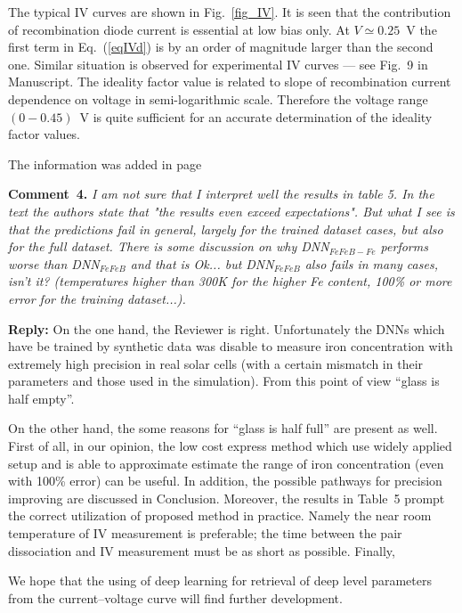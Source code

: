 \documentclass[num-refs]{wiley-article} %
\begin{document}
The typical IV curves are shown in Fig.~\ref{fig_IV}.
It is seen that the contribution of recombination diode current is essential at low bias only.
At $V\simeq 0.25$~V the first term in Eq.~(\ref{eqIVd}) is
by an order of magnitude larger than the second one.
Similar situation is observed for
experimental IV curves --- see Fig.~9 in Manuscript.
The ideality factor value is related to slope of recombination current
dependence on voltage in semi-logarithmic scale.
Therefore the voltage range $(0-0.45)$~V is quite sufficient for an accurate determination of the ideality factor values.



The information was added in page


\vspace{1cm}
\noindent
\textcolor[rgb]{0.00,0.50,1.00}{\textbf{Comment~4.}}
\emph{I am not sure that I interpret well the results in table 5.
In the text the authors state that "the results even exceed expectations".
But what I see is that the predictions fail in general, largely for the trained dataset cases, 
but also for the full dataset.
There is some discussion on why DNN$_{FeFeB-Fe}$ performs worse than DNN$_{FeFeB}$ 
and that is Ok... but DNN$_{FeFeB}$ also fails in many cases, isn't it?
(temperatures higher than 300K for the higher Fe content, 
100\% or more error for the training dataset...).
}

\vspace{0.5cm}
\noindent
\textcolor[rgb]{0.51,0.00,0.00}{\textbf{Reply:}}
On the one hand, the Reviewer is right. 
Unfortunately the DNNs which have be trained by synthetic data 
was disable to measure iron concentration 
with extremely high precision in real solar cells 
(with a certain mismatch in their parameters and those used in the simulation).
From this point of view ``glass is half empty''.

On the other hand, the some reasons for ``glass is half full''
are present as well.
First of all, in our opinion, the 
low cost express method which use widely applied
setup and is able to approximate estimate the range of iron concentration
(even with 100\% error) can be useful.
In addition, the possible pathways for precision improving are discussed in Conclusion.
Moreover, the results in Table~5 prompt the correct utilization of proposed method in practice.
Namely the near room temperature of IV measurement is preferable;
the time between the pair dissociation and IV measurement must be as short as possible.
Finally,  

We hope that the using of deep
learning for retrieval of deep level parameters from the
current--voltage curve will find further development. 
\end{document}

